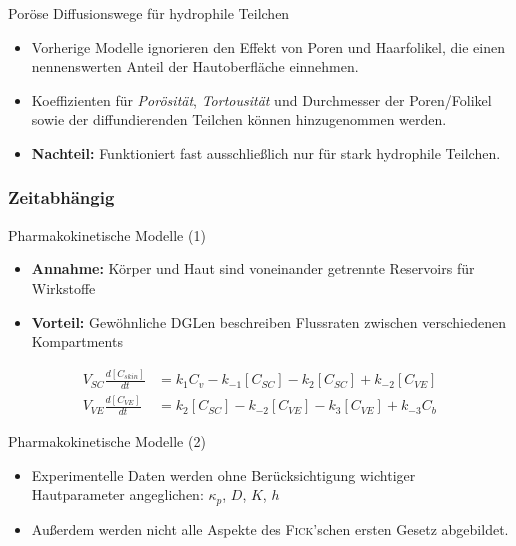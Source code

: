 \documentclass[utf8x,compress,professionalfonts]{beamer}
\begin{document}
\begin{frame}{Por\"ose Diffusionswege f\"ur hydrophile Teilchen}
  \begin{itemize}
    \item<1-> Vorherige Modelle ignorieren den Effekt von Poren und Haarfolikel, die
      einen nennenswerten Anteil der Hautoberfl\"ache einnehmen.
      \bigskip
    \item<2-> Koeffizienten f\"ur \textit{Por\"osit\"at}, \textit{Tortousit\"at} und
      Durchmesser der Poren/Folikel sowie der diffundierenden Teilchen k\"onnen
      hinzugenommen werden.
      \bigskip
    \item<3-> \textbf{Nachteil:} Funktioniert fast ausschlie\ss{}lich nur f\"ur stark
      hydrophile Teilchen.
  \end{itemize}
\end{frame}


\subsubsection{Zeitabh\"angig}
\begin{frame}{Pharmakokinetische Modelle (1)}
  \begin{itemize}
    \item \textbf{Annahme:} K\"orper und Haut sind voneinander getrennte Reservoirs
      f\"ur Wirkstoffe
      \bigskip
    \item \textbf{Vorteil:} Gew\"ohnliche DGLen beschreiben Flussraten zwischen
      verschiedenen Kompartments
  \end{itemize}
  \scriptsize
  \begin{align}
    V_{SC}\frac{d\left[ C_{skin}\right] }{dt} &= k_1C_v - k_{-1}\left[ C_{SC}\right]-k_2\left[ C_{SC}\right]+k_{-2}\left[ C_{VE}\right]\\
    V_{VE}\frac{d\left[ C_{VE}\right] }{dt}   &= k_2\left[ C_{SC}\right] -k_{-2}\left[ C_{VE}\right] -k_3\left[ C_{VE}\right] +k_{-3}C_b
  \end{align}
  \normalsize
\end{frame}

\begin{frame}{Pharmakokinetische Modelle (2)}
  \begin{itemize}
    \item Experimentelle Daten werden ohne Ber\"ucksichtigung wichtiger Hautparameter
      angeglichen: $\kappa_p$, $D$, $K$, $h$
      \bigskip
    \item Au\ss{}erdem werden nicht alle Aspekte des \textsc{Fick}'schen ersten Gesetz
      abgebildet.
  \end{itemize}
\end{frame}
\end{document}
